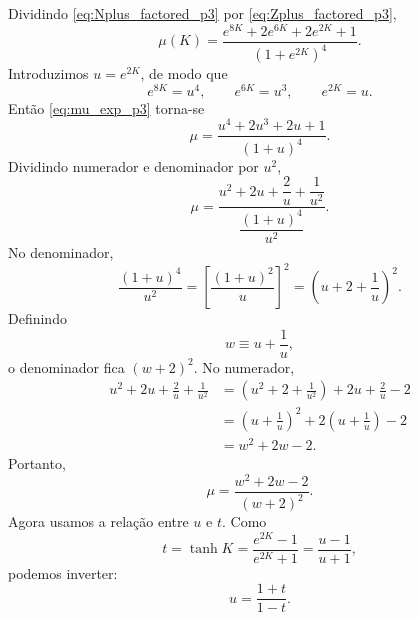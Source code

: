 \documentclass[12pt,a4paper]{article}
\begin{document}
%
Dividindo \eqref{eq:Nplus_factored_p3} por
\eqref{eq:Zplus_factored_p3},
%
\begin{equation}
    \boxed{
    \mu(K)
    =
    \frac{
        e^{8K}+2e^{6K}+2e^{2K}+1
    }
    {\left(1+e^{2K}\right)^4}.
    }
    \label{eq:mu_exp_p3}
\end{equation}
%
Introduzimos \(u=e^{2K}\), de modo que
%
\begin{equation}
    e^{8K}=u^4,
    \qquad
    e^{6K}=u^3,
    \qquad
    e^{2K}=u.
\end{equation}
%
Então \eqref{eq:mu_exp_p3} torna-se
%
\begin{equation}
    \mu
    =
    \frac{
        u^4+2u^3+2u+1
    }
    {(1+u)^4}.
    \label{eq:mu_u_p3}
\end{equation}
%
Dividindo numerador e denominador por \(u^2\),
%
\begin{equation}
    \mu
    =
    \frac{
        u^2+2u+\dfrac{2}{u}+\dfrac{1}{u^2}
    }
    {
        \dfrac{(1+u)^4}{u^2}
    }.
    \label{eq:mu_u_div_p3}
\end{equation}
%
No denominador,
%
\begin{equation}
    \frac{(1+u)^4}{u^2}
    =
    \left[
        \frac{(1+u)^2}{u}
    \right]^2
    =
    \left(
        u+2+\frac{1}{u}
    \right)^2.
    \label{eq:denominator_p3}
\end{equation}
%
Definindo
%
\begin{equation}
    w\equiv u+\frac{1}{u},
    \label{eq:w_def_p3}
\end{equation}
%
o denominador fica \((w+2)^2\). No numerador,
%
\begin{align}
    u^2+2u+\frac{2}{u}+\frac{1}{u^2}
    &=
    \left(
        u^2+2+\frac{1}{u^2}
    \right)
    +
    2u+\frac{2}{u}-2
    \nonumber\\[4pt]
    &=
    \left(
        u+\frac{1}{u}
    \right)^2
    +
    2\left(
        u+\frac{1}{u}
    \right)
    -2
    \nonumber\\[4pt]
    &=
    w^2+2w-2.
    \label{eq:numerator_w_p3}
\end{align}
%
Portanto,
%
\begin{equation}
    \mu
    =
    \frac{w^2+2w-2}{(w+2)^2}.
    \label{eq:mu_w_p3}
\end{equation}
%
Agora usamos a relação entre \(u\) e \(t\). Como
%
\begin{equation}
    t=\tanh K
    =
    \frac{e^{2K}-1}{e^{2K}+1}
    =
    \frac{u-1}{u+1},
\end{equation}
%
podemos inverter:
%
\begin{equation}
    u=\frac{1+t}{1-t}.
    \label{eq:u_t_p3}
\end{equation}
\end{document}
